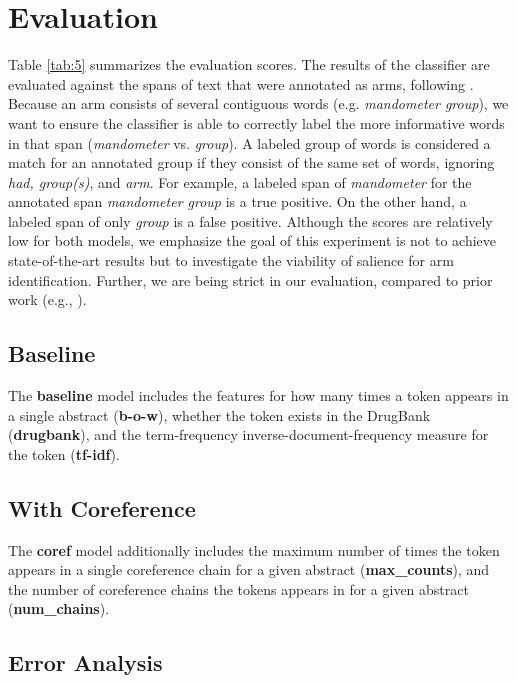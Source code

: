 \section{Evaluation}
Table \ref{tab:5} summarizes the evaluation scores. The results of the classifier are evaluated against the spans of text that were annotated as arms, following . Because an arm consists of several contiguous words (e.g. \textit{mandometer group}), we want to ensure the classifier is able to correctly label the more informative words in that span (\textit{mandometer} vs.  \textit{group}). A labeled group of words is considered a match for an annotated group if they consist of the same set of words, ignoring \textit{had, group(s)}, and \textit{arm}. For example, a labeled span of \textit{mandometer} for the annotated span \textit{mandometer group} is a true positive. On the other hand, a labeled span of only \textit{group} is a false positive. Although the scores are relatively low for both models, we emphasize the goal of this experiment is not to achieve state-of-the-art results but to investigate the viability of salience for arm identification. Further, we are being strict in our evaluation, compared to prior work (e.g.,  ). %

\subsection{Baseline}

The \textbf{baseline} model includes the features for how many times a token appears in a single abstract (\textbf{b-o-w}), whether the token exists in the DrugBank (\textbf{drugbank}), and the term-frequency inverse-document-frequency measure for the token (\textbf{tf-idf}).

\subsection{With Coreference}
The \textbf{coref} model additionally includes the maximum number of times the token appears in a single coreference chain for a given abstract (\textbf{max\_counts}), and the number of coreference chains the tokens appears in for a given abstract (\textbf{num\_chains}).

\subsection{Error Analysis}\label{subsec:errors}

